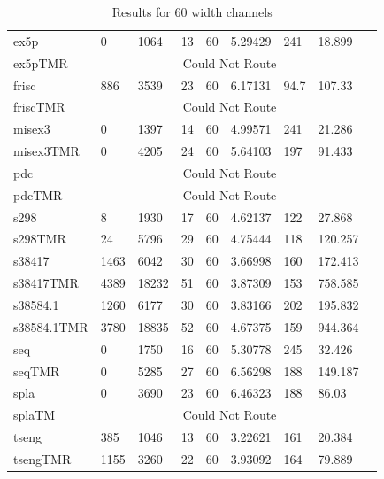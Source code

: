 \documentclass[12pt,final,oneside]{memoir} %
\begin{document}
\begin{table}
\begin{adjustwidth}{-1cm}{-1.2cm}
\begin{tabularx}{1.1\textwidth}{XXXXlXXXX}
ex5p & 0 & 1064 & 13 & 60 & 5.29429 & 241 & 18.899\\
ex5pTMR & \multicolumn{7}{c}{Could Not Route}\\\midrule
frisc & 886 & 3539 & 23 & 60 & 6.17131 & 94.7 & 107.33\\
friscTMR & \multicolumn{7}{c}{Could Not Route} \\\midrule
misex3 & 0 & 1397 & 14 & 60 & 4.99571 & 241 & 21.286\\
misex3TMR & 0 & 4205 & 24 & 60 & 5.64103 & 197 & 91.433\\\midrule
pdc & \multicolumn{7}{c}{Could Not Route} \\
pdcTMR & \multicolumn{7}{c}{Could Not Route} \\\midrule
s298 & 8 & 1930 & 17 & 60 & 4.62137 & 122 & 27.868\\
s298TMR & 24 & 5796 & 29 & 60 & 4.75444 & 118 & 120.257\\\midrule
s38417 & 1463 & 6042 & 30 & 60 & 3.66998 & 160 & 172.413\\
s38417TMR & 4389 & 18232 & 51 & 60 & 3.87309 & 153 & 758.585\\\midrule
s38584.1 & 1260 & 6177 & 30 & 60 & 3.83166 & 202 & 195.832\\
s38584.1TMR & 3780 & 18835 & 52 & 60 & 4.67375 & 159 & 944.364\\\midrule
seq & 0 & 1750 & 16 & 60 & 5.30778 & 245 & 32.426\\
seqTMR & 0 & 5285 & 27 & 60 & 6.56298 & 188 & 149.187\\\midrule
spla & 0 & 3690 & 23 & 60 & 6.46323 & 188 & 86.03\\
splaTM & \multicolumn{7}{c}{Could Not Route}\\\midrule
tseng & 385 & 1046 & 13 & 60 & 3.22621 & 161 & 20.384\\
tsengTMR & 1155 & 3260 & 22 & 60 & 3.93092 & 164 & 79.889\\\bottomrule
    \end{tabularx}
    \caption{Results for 60 width channels}
    \label{Results60}
\end{adjustwidth}
\end{table}
\end{document}
